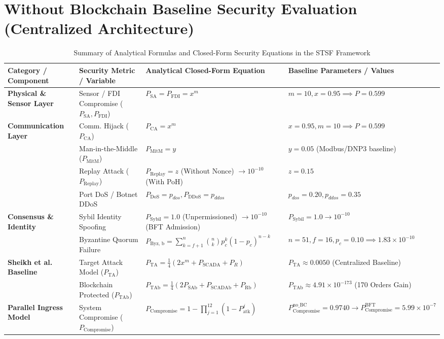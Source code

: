 \documentclass[10pt,twocolumn,journal]{IEEEtran}
\begin{document}
\section{Without Blockchain Baseline Security Evaluation (Centralized Architecture)}


\begin{table}[htbp]
\caption{Summary of Analytical Formulas and Closed-Form Security Equations in the STSF Framework}
\label{tab:all_formulas}
\centering
\scriptsize
\begin{tabular}{@{}llll@{}}
\toprule
\textbf{Category / Component} & \textbf{Security Metric / Variable} & \textbf{Analytical Closed-Form Equation} & \textbf{Baseline Parameters / Values} \\
\midrule
\textbf{Physical \& Sensor Layer} & Sensor / FDI Compromise ($P_{\text{SA}}, P_{\text{FDI}}$) & $P_{\text{SA}} = P_{\text{FDI}} = x^m$ & $m=10, x=0.95 \implies P=0.599$ \\
\textbf{Communication Layer} & Comm. Hijack ($P_{\text{CA}}$) & $P_{\text{CA}} = x^m$ & $x=0.95, m=10 \implies P=0.599$ \\
& Man-in-the-Middle ($P_{\text{MitM}}$) & $P_{\text{MitM}} = y$ & $y=0.05$ (Modbus/DNP3 baseline) \\
& Replay Attack ($P_{\text{Replay}}$) & $P_{\text{Replay}} = z$ (Without Nonce) $\to 10^{-10}$ (With PoH) & $z=0.15$ \\
& Port DoS / Botnet DDoS & $P_{\text{DoS}} = p_{dos}, P_{\text{DDoS}} = p_{ddos}$ & $p_{dos}=0.20, p_{ddos}=0.35$ \\
\textbf{Consensus \& Identity} & Sybil Identity Spoofing & $P_{\text{Sybil}} = 1.0$ (Unpermissioned) $\to 10^{-10}$ (BFT Admission) & $P_{\text{Sybil}}=1.0 \to 10^{-10}$ \\
& Byzantine Quorum Failure & $P_{\text{Byz, b}} = \sum_{k=f+1}^{n} \binom{n}{k} p_c^k (1-p_c)^{n-k}$ & $n=51, f=16, p_c=0.10 \implies 1.83 \times 10^{-10}$ \\
\textbf{Sheikh et al. Baseline} & Target Attack Model ($P_{\text{TA}}$) & $P_{\text{TA}} = \frac{1}{4}\left(2x^m + P_{\text{SCADA}} + P_R\right)$ & $P_{\text{TA}} \approx 0.0050$ (Centralized Baseline) \\
& Blockchain Protected ($P_{\text{TAb}}$) & $P_{\text{TAb}} = \frac{1}{4}\left(2P_{\text{SAb}} + P_{\text{SCADAb}} + P_{\text{Rb}}\right)$ & $P_{\text{TAb}} \approx 4.91 \times 10^{-173}$ (170 Orders Gain) \\
\textbf{Parallel Ingress Model} & System Compromise ($P_{\text{Compromise}}$) & $P_{\text{Compromise}} = 1 - \prod_{j=1}^{12} \left(1 - P_{\text{atk}}^j\right)$ & $P_{\text{Compromise}}^{\text{no\_BC}} = 0.9740 \to P_{\text{Compromise}}^{\text{BFT}} = 5.99 \times 10^{-7}$ \\

\end{tabular}
\end{table}
\end{document}
